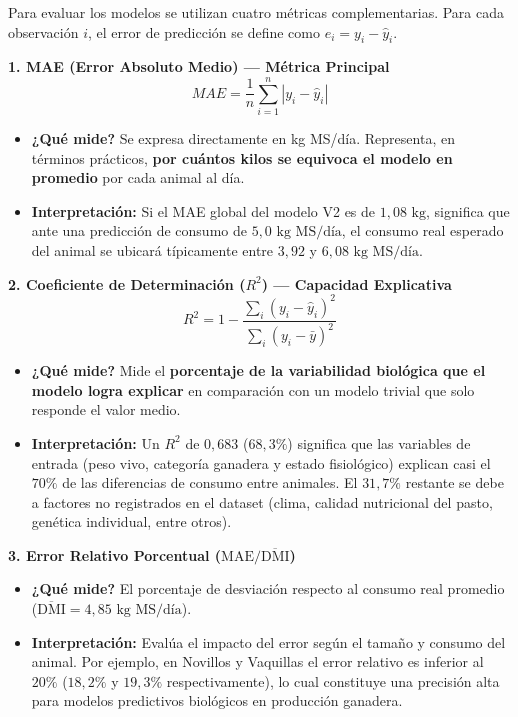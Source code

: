 \documentclass[11pt,a4paper]{article}
\begin{document}
Para evaluar los modelos se utilizan cuatro métricas complementarias. Para cada observación $i$, el error de predicción se define como $e_i = y_i - \hat{y}_i$.

\textbf{1. MAE (Error Absoluto Medio) — Métrica Principal}
\begin{equation}
MAE = \frac{1}{n}\sum_{i=1}^{n}|y_i - \hat{y}_i|
\end{equation}
\begin{itemize}
  \item \textbf{¿Qué mide?} Se expresa directamente en kg MS/día. Representa, en términos prácticos, \textbf{por cuántos kilos se equivoca el modelo en promedio} por cada animal al día.
  \item \textbf{Interpretación:} Si el MAE global del modelo V2 es de $1,08\text{ kg}$, significa que ante una predicción de consumo de $5,0\text{ kg MS/día}$, el consumo real esperado del animal se ubicará típicamente entre $3,92$ y $6,08\text{ kg MS/día}$.
\end{itemize}

\textbf{2. Coeficiente de Determinación ($R^2$) — Capacidad Explicativa}
\begin{equation}
R^2 = 1 - \frac{\sum_i(y_i - \hat{y}_i)^2}{\sum_i(y_i - \bar{y})^2}
\end{equation}
\begin{itemize}
  \item \textbf{¿Qué mide?} Mide el \textbf{porcentaje de la variabilidad biológica que el modelo logra explicar} en comparación con un modelo trivial que solo responde el valor medio.
  \item \textbf{Interpretación:} Un $R^2$ de $0,683$ ($68,3\%$) significa que las variables de entrada (peso vivo, categoría ganadera y estado fisiológico) explican casi el $70\%$ de las diferencias de consumo entre animales. El $31,7\%$ restante se debe a factores no registrados en el dataset (clima, calidad nutricional del pasto, genética individual, entre otros).
\end{itemize}

\textbf{3. Error Relativo Porcentual ($\text{MAE} / \overline{\text{DMI}}$)}
\begin{itemize}
  \item \textbf{¿Qué mide?} El porcentaje de desviación respecto al consumo real promedio ($\overline{\text{DMI}} = 4,85\text{ kg MS/día}$).
  \item \textbf{Interpretación:} Evalúa el impacto del error según el tamaño y consumo del animal. Por ejemplo, en Novillos y Vaquillas el error relativo es inferior al $20\%$ ($18,2\%$ y $19,3\%$ respectivamente), lo cual constituye una precisión alta para modelos predictivos biológicos en producción ganadera.
\end{itemize}
\end{document}
